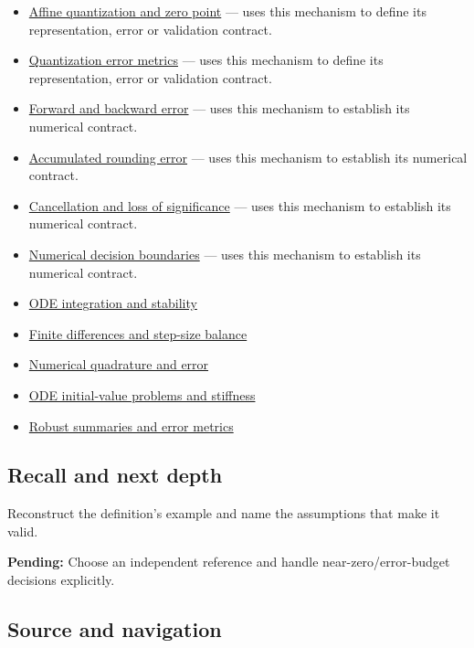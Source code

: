 \begin{itemize}
\item
  \hyperref[appendix-d5da3eaabaef]{Affine quantization and zero point} --- uses this mechanism to define its representation, error or validation contract.
\item
  \hyperref[appendix-537171d69d27]{Quantization error metrics} --- uses this mechanism to define its representation, error or validation contract.
\item
  \hyperref[appendix-a7fbaf6d1b1c]{Forward and backward error} --- uses this mechanism to establish its numerical contract.
\item
  \hyperref[appendix-f82e270791c8]{Accumulated rounding error} --- uses this mechanism to establish its numerical contract.
\item
  \hyperref[appendix-a2773a6a2f9d]{Cancellation and loss of significance} --- uses this mechanism to establish its numerical contract.
\item
  \hyperref[appendix-c80db39080be]{Numerical decision boundaries} --- uses this mechanism to establish its numerical contract.
\item
  \hyperref[appendix-18eacf61a04b]{ODE integration and stability}
\item
  \hyperref[appendix-e2d7b4f2161d]{Finite differences and step-size balance}
\item
  \hyperref[appendix-80521eae6b71]{Numerical quadrature and error}
\item
  \hyperref[appendix-e8ab9836882e]{ODE initial-value problems and stiffness}
\item
  \hyperref[appendix-bcc44e9d3d02]{Robust summaries and error metrics}
\end{itemize}

\subsection{Recall and next depth}\label{appendix-3ae74e89b4e6-recall-and-next-depth}

Reconstruct the definition's example and name the assumptions that make it valid.

\textbf{Pending:} Choose an independent reference and handle near-zero/error-budget decisions explicitly.

\subsection{Source and navigation}\label{appendix-3ae74e89b4e6-source-and-navigation}

